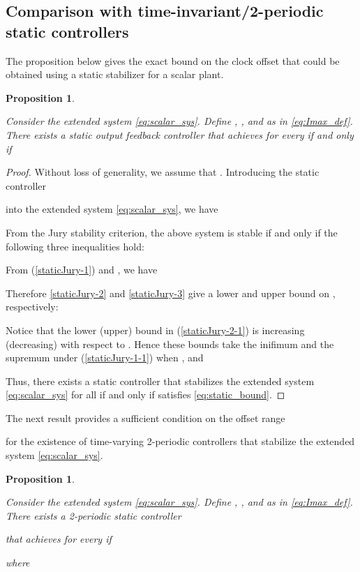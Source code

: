 \documentclass[letterpaper, 12pt, draftcls, onecolumn]{ieeeconf}
\newtheorem{proposition}[theorem]{Proposition}
\begin{document}
\subsection{Comparison with time-invariant/2-periodic 
	static controllers}
The proposition below gives the exact bound
on the clock offset that could be obtained using a static
stabilizer for a scalar plant.
\begin{proposition}
	\label{prop:static}
	{\it
		Consider the extended system \eqref{eq:scalar_sys}.
		Define , , and
		 as in \eqref{eq:Imax_def}.
		There exists  a static output feedback controller
		 that achieves 
		for every  
		if and only if
		
	}
\end{proposition}
\begin{proof}
	Without loss of generality, we assume that .
	Introducing the static controller
	
	into the extended system \eqref{eq:scalar_sys}, we have
	
	From the Jury stability criterion, the above system is stable if and only
	if the following three inequalities hold:
	
	
From (\ref{staticJury-1}) and , we have
	
	Therefore \eqref{staticJury-2}
	and \eqref{staticJury-3} give a lower and upper bound on ,
	respectively:
	
	Notice that the lower (upper)
	bound in (\ref{staticJury-2-1}) is increasing (decreasing) with
	respect to .
Hence these bounds take the inifimum and the supremum under
	(\ref{staticJury-1-1}) when , and
	
	Thus,
	there exists a
	static controller  that stabilizes 
	the extended system \eqref{eq:scalar_sys}
	for all
	 if and only if  satisfies \eqref{eq:static_bound}.
\end{proof}

The next result provides a sufficient condition on the offset range

for the existence of time-varying
2-periodic controllers that 
stabilize the extended system \eqref{eq:scalar_sys}.
\begin{proposition}
	\label{prop:static_periodic}
	{\it
		Consider the extended system \eqref{eq:scalar_sys}.
		Define , ,
		and  as in \eqref{eq:Imax_def}.
		There exists a 2-periodic static controller
		
		that achieves 
		for every 
		if
		
		where 
		
	}
\end{proposition}
\end{document}

